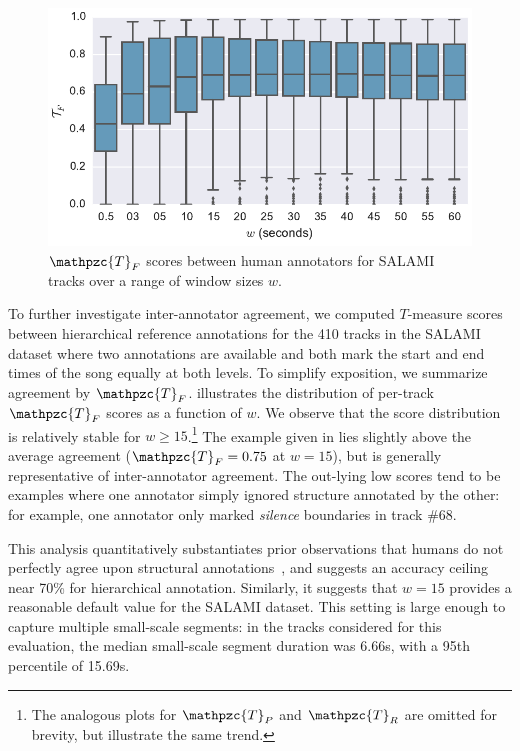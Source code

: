 \documentclass{article}
\def\shag{\ensuremath{\mathpzc{T}}}
\begin{document}
\begin{figure}
    \centering
    \includegraphics[width=\columnwidth]{figs/tfw}
    \caption{$\shag_F$ scores between human annotators for SALAMI tracks over a range of window sizes $w$.\label{fig:salami-agree}}
\end{figure}

To further investigate inter-annotator agreement, we computed $T$-measure scores between hierarchical
reference annotations for the 410 tracks in the SALAMI dataset where two annotations are available and
both mark the start and end times of the song equally at both levels.  
To simplify exposition, we
summarize agreement by $\shag_F$.  illustrates the distribution of
per-track $\shag_F$ scores as a function of $w$.  We observe that the score distribution is relatively stable
for $w \geq 15$.\footnote{The analogous plots for $\shag_P$ and $\shag_R$ are omitted for brevity, but illustrate the same
trend.} 
The example given in  lies slightly above the average agreement
($\shag_F = 0.75$ at $w=15$),
but is generally representative of inter-annotator agreement.
The out-lying low scores tend to be examples where one annotator simply ignored structure annotated
by the other: for example, one annotator only marked \emph{silence} boundaries in track \#68.

This analysis quantitatively substantiates prior observations that humans do not perfectly agree upon structural
annotations~\cite{Smith2013}, and suggests an accuracy ceiling near 70\% for hierarchical annotation.
Similarly, it suggests that $w=15$ provides a reasonable default value for the SALAMI dataset.  This setting
is large enough to capture multiple small-scale segments: in the tracks considered for this evaluation, 
the median small-scale segment duration was 6.66s, with a 95th percentile of 15.69s.
\end{document}

